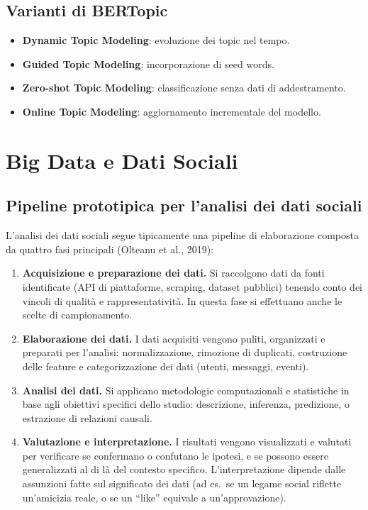 \documentclass[12pt,a4paper]{article}
\begin{document}
\subsection{Varianti di BERTopic}

\begin{itemize}
  \item \textbf{Dynamic Topic Modeling}: evoluzione dei topic nel tempo.
  \item \textbf{Guided Topic Modeling}: incorporazione di seed words.
  \item \textbf{Zero-shot Topic Modeling}: classificazione senza dati di addestramento.
  \item \textbf{Online Topic Modeling}: aggiornamento incrementale del modello.
\end{itemize}

\section{Big Data e Dati Sociali}

\subsection{Pipeline prototipica per l'analisi dei dati sociali}

L'analisi dei dati sociali segue tipicamente una pipeline di elaborazione composta
da quattro fasi principali (Olteanu et al., 2019):

\begin{enumerate}
  \item \textbf{Acquisizione e preparazione dei dati.} Si raccolgono dati da fonti
        identificate (API di piattaforme, scraping, dataset pubblici) tenendo conto
        dei vincoli di qualità e rappresentatività. In questa fase si effettuano
        anche le scelte di campionamento.
  \item \textbf{Elaborazione dei dati.} I dati acquisiti vengono puliti, organizzati
        e preparati per l'analisi: normalizzazione, rimozione di duplicati,
        costruzione delle feature e categorizzazione dei dati (utenti, messaggi, eventi).
  \item \textbf{Analisi dei dati.} Si applicano metodologie computazionali e
        statistiche in base agli obiettivi specifici dello studio: descrizione,
        inferenza, predizione, o estrazione di relazioni causali.
  \item \textbf{Valutazione e interpretazione.} I risultati vengono visualizzati e
        valutati per verificare se confermano o confutano le ipotesi, e se possono
        essere generalizzati al di là del contesto specifico. L'interpretazione
        dipende dalle assunzioni fatte sul significato dei dati (ad es.\ se un
        legame social riflette un'amicizia reale, o se un ``like'' equivale a
        un'approvazione).
\end{enumerate}
\end{document}

